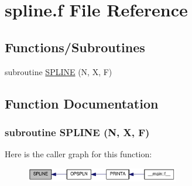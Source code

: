 \hypertarget{spline_8f}{
\section{spline.f File Reference}
\label{spline_8f}
}
\subsection*{Functions/Subroutines}
\begin{DoxyCompactItemize}
\item 
subroutine \hyperlink{spline_8f_aed6d468caeb9396c6db153182a07f670}{SPLINE} (N, X, F)
\end{DoxyCompactItemize}


\subsection{Function Documentation}
\hypertarget{spline_8f_aed6d468caeb9396c6db153182a07f670}{
\subsubsection[{SPLINE}]{\setlength{\rightskip}{0pt plus 5cm}subroutine SPLINE (N, \/  X, \/  F)}}
\label{spline_8f_aed6d468caeb9396c6db153182a07f670}


Here is the caller graph for this function:\nopagebreak
\begin{figure}[H]
\begin{center}
\leavevmode
\includegraphics[width=189pt]{spline_8f_aed6d468caeb9396c6db153182a07f670_icgraph}
\end{center}
\end{figure}
